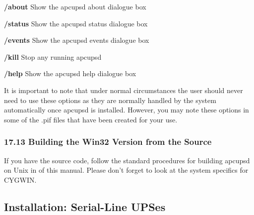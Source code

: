 {{{{{{{{{{\begin{description}
\item {\bf /about}
Show the apcupsd about dialogue box  

\item {\bf /status}
Show the apcupsd status dialogue box  

\item {\bf /events}
Show the apcupsd events dialogue box  

\item {\bf /kill}
Stop any running apcupsd  

\item {\bf /help}
Show the apcupsd help dialogue box 
\end{description}

It is important to note that under normal circumstances the user should never
need to use these options as they are normally handled by the system
automatically once apcupsd is installed. However, you may note these options
in some of the .pif files that have been created for your use. 

\label{Building-the-Win32-Version-from-the-Source}

\subsubsection*{17.13 Building the Win32 Version from the Source}

\label{index-Windows_002c-Building-187}
\label{index-Building_002c-Windows-188}
If you have the source code, follow the standard procedures for building
apcupsd on Unix in 
 of this manual. Please
don't forget to look at the system specifics for CYGWIN. 

\label{Installation-on-Serial_002dLine-UPSes}

\subsection*{Installation: Serial-Line UPSes}

\label{Overview-of-Serial_002dInterface-UPSes}

}}}}}}}}}}

